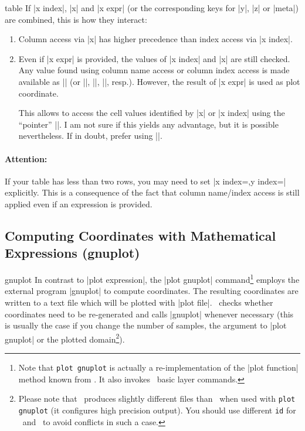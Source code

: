 {\begin{addplotoperation}[]{table}{}
	If |x index|, |x| and |x expr| (or the corresponding keys for |y|, |z| or |meta|) are combined, this is how they interact:
	\begin{enumerate}
		\item Column access via |x| has higher precedence than index access via |x index|.
		\item Even if |x expr| is provided, the values of |x index| and |x| are still checked. Any value found using column name access or column index access is made available as |\columnx| (or |\columny|, |\columnz|, |\columnmeta|, resp.). However, the result of |x expr| is used as plot coordinate.

		This allows to access the cell values identified by |x| or |x index| using the ``pointer'' |\columnx|. I am not sure if this yields any advantage, but it is possible nevertheless. If in doubt, prefer using |\thisrow|.
	\end{enumerate}

	\paragraph{Attention:} If your table has less than two rows, you may need to set |x index={},y index={}| explicitly. This is a consequence of the fact that column name/index access is still applied even if an expression is provided.
\end{addplotoperation}

\subsection{Computing Coordinates with Mathematical Expressions (gnuplot)}

\begin{addplotoperation}[]{gnuplot}{}
In contrast to |plot expression|, the |plot gnuplot| command\footnote{Note that \texttt{plot gnuplot} is actually a re-implementation of the |plot function| method known from \PGF. It also invokes \PGF\ basic layer commands.} employs the external program |gnuplot| to compute coordinates. The resulting coordinates are written to a text file which will be plotted with |plot file|. \PGF\ checks whether coordinates need to be re-generated and calls |gnuplot| whenever necessary (this is usually the case if you change the number of samples, the argument to |plot gnuplot| or the plotted domain\footnote{Please note that \PGFPlots\ produces slightly different files than \Tikz\ when used with \texttt{plot gnuplot} (it configures high precision output). You should use different \texttt{id} for \PGFPlots\ and \Tikz\ to avoid conflicts in such a case.}).


\end{addplotoperation}}
